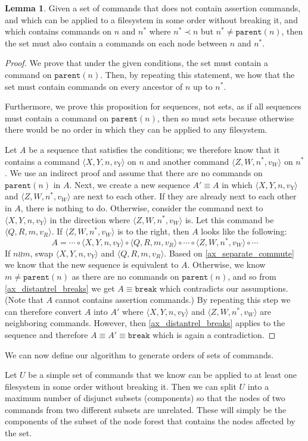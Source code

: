 \documentclass[12pt]{article}
\newcommand{\parent}{\mathtt{parent}}
\newcommand{\nn}{n^*} %
\newcommand{\cbrk}{\mathtt{break}} %
\newcommand{\valvy}{v_Y} %
\newcommand{\valvw}{v_W}
\newcommand{\valvr}{v_R}
\newcommand{\caaaa}[4]{\langle{#1,#2,#3,#4}\rangle}
\newcommand{\cxynv}{\caaaa{X}{Y}{n}{\valvy}}
\newcommand{\czwnnv}{\caaaa{Z}{W}{\nn}{\valvw}}
\newcommand{\cqrmv}{\caaaa{Q}{R}{m}{\valvr}}
\newcommand{\cc}{\circ} %
\newcommand{\descendant}{\prec}
\newcommand{\indep}{\mathrel{\wr\wr}} %
\newcommand{\unrel}{\indep} %
\theoremstyle{definition}
\newtheorem{mylem}{Lemma}
\begin{document}
\begin{mylem}\label{connected_changes}
Given a set of commands that
does not contain assertion commands,
and which can be applied to a filesystem in some order without breaking it,
and which contains commands on $n$ and $\nn$ where $\nn\descendant n$
but $\nn\neq\parent(n)$, then the set must also contain a commands
on each node between $n$ and $\nn$.
\end{mylem}
\begin{proof}
We prove that under the given conditions, the set must contain a command on $\parent(n)$.
Then, by repeating this statement, we how that the set must contain commands on every
ancestor of $n$ up to $\nn$.

Furthermore,
we prove this proposition for sequences, not sets, as if all sequences must contain a command on $\parent(n)$,
then so must sets because otherwise there would be no order in which they can be
applied to any filesystem.

Let $A$ be a sequence that satisfies the conditions;
we therefore know that it contains a command $\cxynv$ on $n$
and another command $\czwnnv$ on $\nn$.
We use an indirect proof and assume that there are no commands on $\parent(n)$ in $A$.
Next, we create a new sequence $A'\equiv A$ in which $\cxynv$ and $\czwnnv$ are next to each other.
If they are already next to each other in $A$, there is nothing to do.
Otherwise, consider the command next to $\cxynv$ in the direction where $\czwnnv$ is.
Let this command be $\cqrmv$.
If $\czwnnv$ is to the right, then $A$ looks like the following:
\[ A = \cdots\cc\cxynv\cc\cqrmv\cc\cdots\cc\czwnnv\cc\cdots \]
If $n\unrel m$, swap $\cxynv$ and $\cqrmv$. Based on \cref{ax_separate_commute} we know that the new
sequence is equivalent to $A$.
Otherwise, we know $m\neq\parent(n)$ as there are no commands on $\parent(n)$, and so
from \cref{ax_distantrel_breaks} we get $A\equiv\cbrk$ which contradicts our assumptions.
(Note that $A$ cannot contains assertion commands.)
By repeating this step we can therefore convert $A$ into $A'$ where $\cxynv$ and $\czwnnv$ are neighboring commands.
However, then \cref{ax_distantrel_breaks} applies to the sequence and therefore $A\equiv A'\equiv\cbrk$ which
is again a contradiction.
\end{proof}

\medskip

We can now define our algorithm to generate orders of sets of commands.

Let $U$ be a simple set of commands
that we know can be applied to at least one filesystem in some order without breaking it.
Then we can split $U$ into a maximum number of disjunct subsets
(components) so that the nodes of two commands from two different subsets are unrelated.
These will simply be the components of the subset of the node forest that contains the nodes affected by the set.
\end{document}
